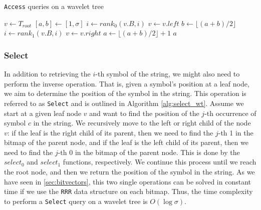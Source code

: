 \begin{algorithm}[h!]
    \caption{\texttt{Access} queries on a wavelet tree}\label{alg:access_wt}
    \begin{algorithmic}
         
        \State $v \gets T_{root}$ 
        \State $[a,b] \gets [1,\sigma]$
         
        \State $i \gets rank_0(v.B,i)$
        \State $v \gets v.left$ 
        \State $b \gets \lfloor (a+b)/2 \rfloor$
        \Else
        \State $i \gets rank_1(v.B,i)$
        \State $v \gets v.right$ 
        \State $a \gets \lfloor (a+b)/2 \rfloor +1$
        \EndIf
        \EndWhile
        \State \Return $a$
        \EndFunction
    \end{algorithmic}
\end{algorithm}


\subsubsection{Select}
In addition to retrieving the $i$-th symbol of the string, we might also need to perform the inverse operation. That is, given a symbol's position at a leaf node, we aim to determine the position of the symbol in the string. This operation is referred to as \texttt{Select} and is outlined in Algorithm \ref{alg:select_wt}. Assume we start at a given leaf node $v$ and want to find the position of the $j$-th occurrence of symbol $c$ in the string. We recursively move to the left or right child of the node $v$: if the leaf is the right child of its parent, then we need to find the $j$-th 1 in the bitmap of the parent node, and if the leaf is the left child of its parent, then we need to find the $j$-th 0 in the bitmap of the parent node. This is done by the $select_0$ and $select_1$ functions, respectively. We continue this process until we reach the root node, and then we return the position of the symbol in the string. As we have seen in \autoref{sec:bitvectors}, this two single operations can be solved in constant time if we use the \texttt{RRR} data structure \cite{RRR2002} on each bitmap. Thus, the time complexity to perform a \texttt{Select} query on a wavelet tree is $O(\log \sigma)$.


